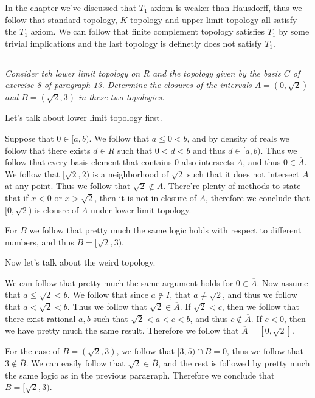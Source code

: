 \documentclass[11pt,oneside,titlepage]{book}
\begin{document}
In the chapter we've discussed that $T_1$ axiom is weaker than Hausdorff, thus we follow that
standard topology, $K$-topology and upper limit topology all satisfy the $T_1$ axiom.
We can follow that finite complement topology satisfies $T_1$ by some trivial
implications and the last topology is definetly does not satisfy $T_1$.

\subsection{}

\textit{Consider teh lower limit topology on $R$ and the topology given by the
  basis $C$ of exercise 8 of paragraph 13. Determine the closures of the intervals
  $A = (0, \sqrt{2})$ and $B = (\sqrt{2}, 3)$ in these two topologies.
}

Let's talk about lower limit topology first.

Suppose that $0 \in [a, b)$. We follow that $a \leq 0 < b$, and by density of reals we follow that
there exists $d \in R$ such that $0 < d < b$ and thus $d \in [a, b)$.
Thus we follow that every basis element that contains $0$ also intersects $A$, and thus
$0 \in \overline{A}$. We follow that $[\sqrt{2}, 2)$ is a neighborhood of $\sqrt{2}$ such that
it does not intersect $A$ at any point. Thus we follow that $\sqrt{2} \notin \overline{A}$.
There're plenty of methods to state that if $x < 0$ or $x > \sqrt{2}$, then it is not
in closure of $A$, therefore we conclude that $[0, \sqrt{2})$ is clousre of $A$ under
lower limit topology.

For $B$ we follow that pretty much the same logic holds with respect to different numbers,
and thus $\overline{B} = [\sqrt{2}, 3)$.

Now let's talk about the weird topology.

We can follow that pretty much the same argument holds for $0 \in \overline{A}$.
Now assume that $a \leq \sqrt{2} < b$. We follow that since $a \notin I$, that
$a \neq \sqrt{2}$, and thus we follow that $a < \sqrt{2} < b$. Thus 
we follow that $\sqrt{2} \in \overline{A}$. If $\sqrt{2} < c$,
then we follow that there exist rational $a, b$ such that $\sqrt{2} < a < c < b$,
and thus $c \notin \overline{A}$. If $c < 0$, then we have pretty much the same result.
Therefore we follow that $\overline{A} = [0, \sqrt{2}]$.

For the case of $B = (\sqrt{2}, 3)$, we follow that $[3, 5) \cap B = 0$, thus we follow that
$3 \notin \overline{B}$. We can easily follow that $\sqrt{2} \in \overline{B}$,
and the rest is followed by pretty much the same logic as in the previous paragraph.
Therefore we conclude that $\overline{B} = [\sqrt{2}, 3)$.
\end{document}
